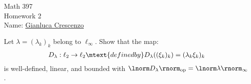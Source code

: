 \documentclass[11pt,twoside,openany]{memoir}
\begin{document}
\begin{center}
{\large Math 397 \\[0.1in]Homework 2 \\[0.1in]}
{Name:} {\underline{Gianluca Crescenzo\hspace*{2in}}}\\[0.15in]
\end{center}
\vspace{4pt}
    \addtocounter{exercise}{4}
    \begin{exercise}
        Let $\lambda = (\lambda_k)_k$ belong to $\ell_\infty$. Show that the map:
            \begin{equation*}
            \begin{split}
                D_\lambda: \ell_2 \rightarrow \ell_2 \mtext{defined by} D_\lambda((\xi_k)_k) = (\lambda_k \xi_k)_k
            \end{split}
            \end{equation*}
        is well-defined, linear, and bounded with $\lnorm D_\lambda \rnorm_\text{op} = \lnorm \lambda \rnorm_\infty$.
    \end{exercise}
\end{document}
